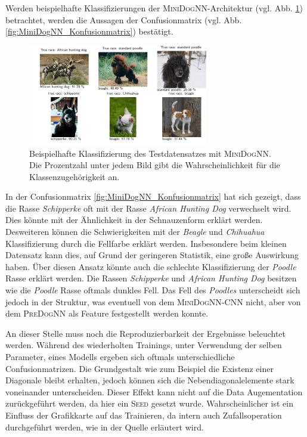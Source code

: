 Werden beispielhafte Klassifizierungen der \textsc{MiniDogNN}-Architektur (vgl. Abb. \ref{fig:klasifizierung_MiniDogNN}) betrachtet, werden die Aussagen der Confusionmatrix
(vgl. Abb. \ref{fig:MiniDogNN_Konfusionmatrix}) bestätigt.
\begin{figure}
\centering
\includegraphics[width = 0.7\textwidth]{../../final_data/MiniNN_n5/visualize_predictions.pdf}
\caption{Beispielhafte Klassifizierung des Testdatensatzes mit \textsc{MiniDogNN}.
        Die Prozentzahl unter jedem Bild gibt die Wahrscheinlichkeit für die Klassenzugehörigkeit an.}
\label{fig:klasifizierung_MiniDogNN}
\end{figure}
In der Confusionmatrix \ref{fig:MiniDogNN_Konfusionmatrix} hat sich gezeigt, dass
die Rasse \emph{Schipperke} oft mit der Rasse \emph{African Hunting Dog} verwechselt
wird. Dies könnte mit der Ähnlichkeit in der Schnauzenform erklärt werden. Desweiteren
können die Schwierigkeiten mit der \emph{Beagle} und \emph{Chihuahua} Klassifizierung
durch die Fellfarbe erklärt werden. Insbesondere beim kleinen Datensatz kann dies,
auf Grund der geringeren Statistik, eine große Auswirkung haben. Über diesen Ansatz
könnte auch die schlechte Klassifizierung der \emph{Poodle} Rasse erklärt werden.
Die Rassen \emph{Schipperke} und \emph{African Hunting Dog} besitzen wie die
\emph{Poodle} Rasse oftmals dunkles Fell. Das Fell des \emph{Poodles} unterscheidt sich
jedoch in der Struktur, was eventuell von dem \textsc{MiniDogNN}-CNN nicht, aber von dem
\textsc{PreDogNN} als Feature festgestellt werden konnte.

An dieser Stelle muss noch die Reproduzierbarkeit der Ergebnisse beleuchtet werden.
Während des wiederholten Trainings, unter Verwendung der selben Parameter, eines Modells
ergeben sich oftmals unterschiedliche Confusionmatrizen. Die Grundgestalt wie zum Beispiel
die Existenz einer Diagonale bleibt erhalten, jedoch können sich die Nebendiagonalelemente
stark voneinander unterscheiden. Dieser Effekt kann nicht auf die Data Augementation
zurückgeführt werden, da hier ein \textsc{Seed} gesetzt wurde. Wahrscheinlicher ist ein Einfluss
der Grafikkarte auf das Trainieren, da intern auch Zufallsoperation durchgeführt werden,
wie in der Quelle \cite{Reproduzierbarkeit} erläutert wird.


